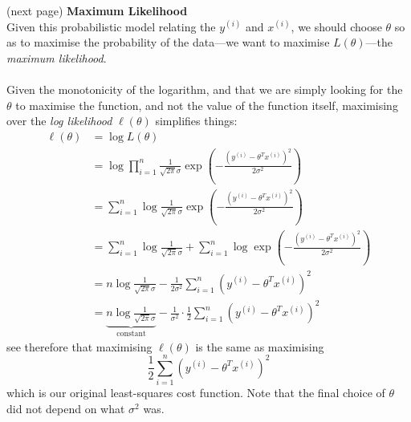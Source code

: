 \documentclass{report}
\begin{document}
(next page)
\newpage
\noindent\textbf{Maximum Likelihood}\\
Given this probabilistic model relating the $y^{(i)}$ and $x^{(i)}$, we should choose $\theta$ so as to maximise
the probability of the data---we want to maximise $L(\theta)$---the \textit{maximum likelihood}.\\
\vspace{1mm}\\
Given the monotonicity of the logarithm, and that we are simply looking for the $\theta$ to maximise the function,
and not the value of the function itself, maximising over the \textit{log likelihood} $\ell(\theta)$ simplifies 
things:
\begin{align*}
\ell(\theta)&=\log L(\theta)\\
&=\log\prod^n_{i=1}\frac{1}{\sqrt{2\pi}\sigma}\exp\left(-\frac{(y^{(i)}-\theta^Tx^{(i)})^2}{2\sigma^2}\right)\\
&=\sum^n_{i=1}\log\frac{1}{\sqrt{2\pi}\sigma}\exp\left(-\frac{(y^{(i)}-\theta^Tx^{(i)})^2}{2\sigma^2}\right)\\
&=\sum^n_{i=1}\log\frac{1}{\sqrt{2\pi}\sigma}+\sum^n_{i=1}\log\exp\left(-\frac{(y^{(i)}
-\theta^Tx^{(i)})^2}{2\sigma^2}\right)\\
&=n\log\frac{1}{\sqrt{2\pi}\sigma}-\frac{1}{2\sigma^2}\sum^n_{i=1}(y^{(i)}-\theta^Tx^{(i)})^2\\
&=\underbrace{n\log\frac{1}{\sqrt{2\pi}\sigma}}_{\text{constant}}
-\frac{1}{\sigma^2}\cdot\frac{1}{2}\sum^n_{i=1}(y^{(i)}-\theta^Tx^{(i)})^2
\end{align*}
see therefore that maximising $\ell(\theta)$ is the same as maximising
\begin{equation*}
\frac{1}{2}\sum^n_{i=1}(y^{(i)}-\theta^Tx^{(i)})^2
\end{equation*}
which is our original least-squares cost function. Note that the final choice of $\theta$ did not depend on what 
$\sigma^2$ was.
\newpage

\subsection{}
\end{document}
